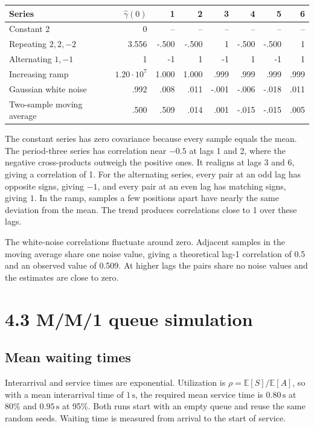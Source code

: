 \documentclass[a4paper,11pt]{article}
\begin{document}
\begin{center}
\small
\setlength{\tabcolsep}{4pt}
\begin{tabular}{lrrrrrrr}
\hline
Series & \(\widehat{\gamma}(0)\) & 1 & 2 & 3 & 4 & 5 & 6 \\
\hline
Constant \(2\) & 0 & -- & -- & -- & -- & -- & -- \\
Repeating \(2,2,-2\) & 3.556 & -.500 & -.500 & 1 & -.500 & -.500 & 1 \\
Alternating \(1,-1\) & 1 & -1 & 1 & -1 & 1 & -1 & 1 \\
Increasing ramp & \(1.20 \cdot 10^7\) & 1.000 & 1.000 & .999 & .999 & .999 & .999 \\
Gaussian white noise & .992 & .008 & .011 & -.001 & -.006 & -.018 & .011 \\
Two-sample moving average & .500 & .509 & .014 & .001 & -.015 & -.015 & .005 \\
\hline
\end{tabular}
\end{center}

The constant series has zero covariance because every sample equals
the mean. The period-three series has correlation near \(-0.5\) at
lags 1 and 2, where the negative cross-products outweigh the positive
ones. It realigns at lags 3 and 6, giving a correlation of 1.
For the alternating series, every pair at an odd lag has opposite
signs, giving \(-1\), and every pair at an even lag has matching signs,
giving \(1\). In the ramp, samples a few positions apart have nearly
the same deviation from the mean. The trend produces correlations
close to 1 over these lags.

The white-noise correlations fluctuate around zero. Adjacent samples
in the moving average share one noise value, giving a theoretical
lag-1 correlation of 0.5 and an observed value of 0.509. At higher
lags the pairs share no noise values and the estimates are close to zero.

\section*{4.3 M/M/1 queue simulation}

\subsection*{Mean waiting times}

Interarrival and service times are exponential. Utilization is
\(\rho = \mathbb{E}[S]/\mathbb{E}[A]\), so with a mean interarrival
time of \(1\,\mathrm{s}\), the required mean service time is
\(0.80\,\mathrm{s}\) at 80\% and \(0.95\,\mathrm{s}\) at 95\%.
Both runs start with an empty queue and reuse the same random seeds.
Waiting time is measured from arrival to the start of service.
\end{document}
